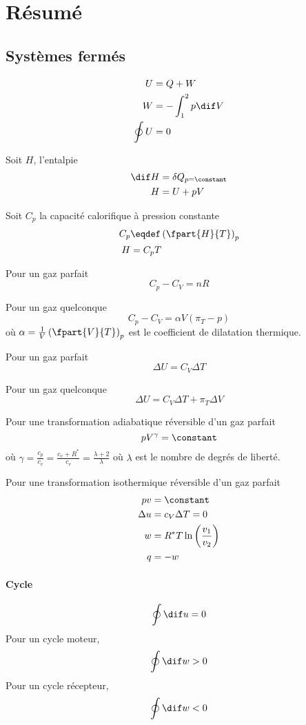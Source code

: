 \section{Résumé}
\subsection{Systèmes fermés}
\begin{align*}
  U & = Q + W\\
  W & = -\int_1^2 p \dif V\\
  \oint U & = 0
\end{align*}

Soit $H$, l'entalpie
\begin{align*}
  \dif H & = \delta Q_{p = \constant}\\
  H & = U + pV
\end{align*}

Soit $C_p$ la capacité calorifique à pression constante
\begin{align*}
  C_p & \eqdef \left(\fpart{H}{T}\right)_p\\
  H & = C_p T %
\end{align*}

Pour un gaz parfait
\[ C_p - C_V = nR \]

Pour un gaz quelconque
\[ C_p - C_V = \alpha V (\pi_T - p) \]
où $\alpha = \frac{1}{V} \left(\fpart{V}{T}\right)_p$
est le coefficient de dilatation thermique.

Pour un gaz parfait
\[ \Delta U = C_V \Delta T \]

Pour un gaz quelconque
\[ \Delta U = C_V \Delta T + \pi_T \Delta V \]


Pour une transformation adiabatique réversible d'un gaz parfait
\[ pV^\gamma = \constant \]
où $\gamma = \frac{c_p}{c_v} = \frac{c_v+R^*}{c_v} = \frac{\lambda+2}{\lambda}$
où $\lambda$ est le nombre de degrés de liberté.

Pour une transformation isothermique réversible d'un gaz parfait
\begin{align*}
  pv & = \constant\\
  \Delta u & = c_V \Delta T = 0\\
  w & = R^* T \ln\left(\frac{v_1}{v_2}\right)\\
  q & = -w
\end{align*}

\paragraph{Cycle}
\[ \oint \dif u = 0 \]
Pour un cycle moteur,
\[ \oint \dif w > 0 \]
Pour un cycle récepteur,
\[ \oint \dif w < 0 \]

